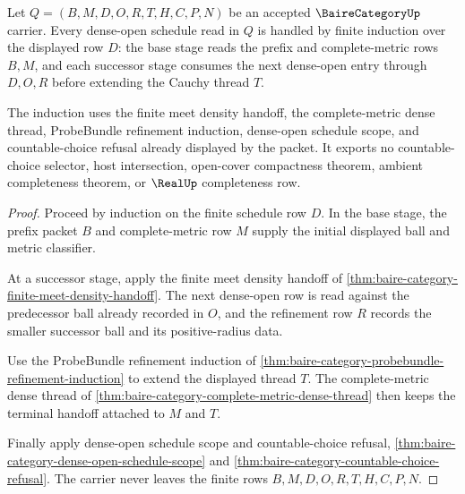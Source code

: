 \begin{theorem}
\label{thm:baire-category-finite-schedule-choice-free-induction}
Let $Q=(B,M,D,O,R,T,H,C,P,N)$ be an accepted $\BaireCategoryUp$ carrier. Every dense-open schedule read in $Q$ is handled by finite induction over the displayed row $D$: the base stage reads the prefix and complete-metric rows $B,M$, and each successor stage consumes the next dense-open entry through $D,O,R$ before extending the Cauchy thread $T$.

The induction uses the finite meet density handoff, the complete-metric dense thread, ProbeBundle refinement induction, dense-open schedule scope, and countable-choice refusal already displayed by the packet. It exports no countable-choice selector, host intersection, open-cover compactness theorem, ambient completeness theorem, or $\RealUp$ completeness row.
\end{theorem}
\begin{proof}
Proceed by induction on the finite schedule row $D$. In the base stage, the prefix packet $B$ and complete-metric row $M$ supply the initial displayed ball and metric classifier.

At a successor stage, apply the finite meet density handoff of \autoref{thm:baire-category-finite-meet-density-handoff}. The next dense-open row is read against the predecessor ball already recorded in $O$, and the refinement row $R$ records the smaller successor ball and its positive-radius data.

Use the ProbeBundle refinement induction of \autoref{thm:baire-category-probebundle-refinement-induction} to extend the displayed thread $T$. The complete-metric dense thread of \autoref{thm:baire-category-complete-metric-dense-thread} then keeps the terminal handoff attached to $M$ and $T$.

Finally apply dense-open schedule scope and countable-choice refusal, \autoref{thm:baire-category-dense-open-schedule-scope} and \autoref{thm:baire-category-countable-choice-refusal}. The carrier never leaves the finite rows $B,M,D,O,R,T,H,C,P,N$.
\end{proof}

